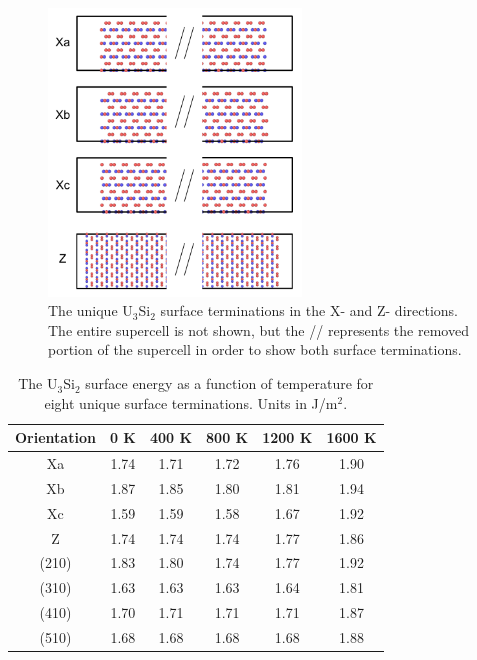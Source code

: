 \documentclass[review]{elsarticle}
\begin{document}
\begin{figure}[h]
 \centering
 \includegraphics[width=0.6\textwidth]{surfX.png} 
 \caption{The unique U$_{3}$Si$_{2}$ surface terminations in the X- and Z- directions. The entire supercell is not shown, but the // represents the removed portion of the supercell in order to show both surface terminations. }
 \label{fig:surfXZ}
\end{figure}

\begin{table}[h]
\caption{The U$_{3}$Si$_{2}$ surface energy as a function of temperature for eight unique surface terminations. Units in J/m$^{2}$.} \label{tab:surfT}
\begin{center}
\begin{tabular}{|c|c|c|c|c|c|}
	\hline
	Orientation & 0 K & 400 K & 800 K & 1200 K & 1600 K\\
	 \hline
	 Xa & 1.74	 & 1.71 & 1.72 & 1.76 & 1.90 \\
	 Xb & 1.87 & 1.85 & 1.80 & 1.81 & 1.94 \\
	 Xc & 1.59	 & 1.59 & 1.58 & 1.67 & 1.92 \\
	 Z & 1.74 & 1.74 & 1.74 & 1.77 & 1.86 \\
	 (210) & 1.83 & 	1.80 & 1.74 & 1.77 & 1.92 \\
	 (310) & 1.63 & 1.63 & 1.63 & 1.64 & 1.81 \\	 
	 (410) & 1.70 & 1.71 & 1.71 & 1.71 & 1.87 \\
	 (510) & 1.68 & 1.68 & 1.68 & 1.68 & 1.88 \\
	 \hline
\end{tabular}
\end{center}
\label{default}
\end{table}
\end{document}
